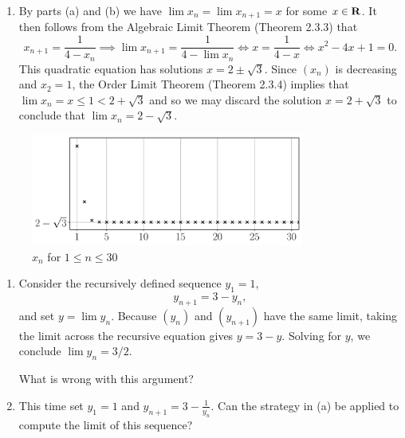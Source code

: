 \documentclass{lew98_solutions}
\begin{document}
\begin{solution}
\begin{enumerate}
        \item By parts (a) and (b) we have \( \lim x_n = \lim x_{n+1} = x \) for some \( x \in \mathbf{R} \). It then follows from the Algebraic Limit Theorem (Theorem 2.3.3) that
        \[
            x_{n+1} = \frac{1}{4 - x_n} \implies \lim x_{n+1} = \frac{1}{4 - \lim x_n} \iff x = \frac{1}{4 - x} \iff x^2 - 4x + 1 = 0.
        \]
        This quadratic equation has solutions \( x = 2 \pm \sqrt{3} \). Since \( (x_n) \) is decreasing and \( x_2 = 1 \), the Order Limit Theorem (Theorem 2.3.4) implies that \( \lim x_n = x \leq 1 < 2 + \sqrt{3} \) and so we may discard the solution \( x = 2 + \sqrt{3} \) to conclude that \( \lim x_n = 2 - \sqrt{3} \).
    \end{enumerate}
    \begin{figure}
        \centering
        \includegraphics[width=0.8\textwidth]{UA_Figures/UA_ex2_4_1_fig.pdf}
        \caption{\( x_n \) for \( 1 \leq n \leq 30 \)}
        \label{fig:ex2.4.1}
    \end{figure}
\end{solution}

\begin{exercise}
\label{ex:2.4.2}
    \begin{enumerate}
        \item Consider the recursively defined sequence \( y_1 = 1 \),
        \[
            y_{n+1} = 3 - y_n,
        \]
        and set \( y = \lim y_n \). Because \( (y_n) \) and \( (y_{n+1}) \) have the same limit, taking the limit across the recursive equation gives \( y = 3 - y \). Solving for \( y \), we conclude \( \lim y_n = 3/2 \).

        What is wrong with this argument?

        \item This time set \( y_1 = 1 \) and \( y_{n+1} = 3 - \frac{1}{y_n} \). Can the strategy in (a) be applied to compute the limit of this sequence?
    \end{enumerate}
\end{exercise}
\end{document}

